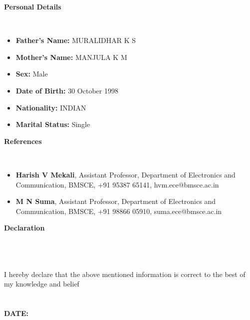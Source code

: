 \documentclass[a4paper,10pt]{article}
\newcommand{\lsep}{-0.5cm}
\newcommand{\resheading}[1]{{\small \colorbox{mygrey}{\begin{minipage}{0.975\textwidth}{\textbf{#1 \vphantom{p\^{E}}}}\end{minipage}}}}
\begin{document}
\resheading{\textbf{Personal Details} }\\[\lsep]
\begin{itemize}
\item \noindent \textbf{Father's Name:} MURALIDHAR K S
\item \noindent \textbf{Mother's Name:} MANJULA K M
\item \noindent \textbf{Sex:} Male
\item \noindent \textbf{Date of Birth:} 30 October 1998
\item \noindent \textbf{Nationality:} INDIAN
\item \noindent \textbf{Marital Status:} Single
\end{itemize}


\resheading{\textbf{References} }\\[\lsep]
\begin{itemize}
\item\noindent\textbf{Harish V Mekali}, Assistant Professor, Department of Electronics and Communication, BMSCE, +91 95387 65141, hvm.ece@bmsce.ac.in
\item\noindent\textbf{M N Suma}, Assistant Professor, Department of Electronics and Communication, BMSCE, +91 98866 05910, suma.ece@bmsce.ac.in
\end{itemize}

\resheading{\textbf{Declaration} }\\[\lsep]\\\\
\indent I hereby declare that the above mentioned information is correct to the best of my knowledge and belief\\\\\\
\indent\textbf{DATE:} \@date
\end{document}
